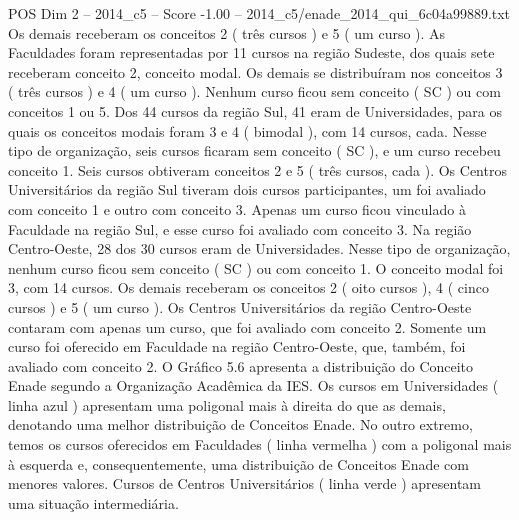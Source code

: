 \begin{textsample}{POS Dim 2 – 2014\_c5 – Score -1.00 – 2014\_c5/enade\_2014\_qui\_6c04a99889.txt}
Os demais receberam os conceitos 2 ( três cursos ) e 5 ( um curso ).
As Faculdades foram representadas por 11 cursos na região Sudeste, dos quais sete receberam conceito 2, conceito modal.
Os demais se distribuíram nos conceitos 3 ( três cursos ) e 4 ( um curso ).
Nenhum curso ficou sem conceito ( SC ) ou com conceitos 1 ou 5.
Dos 44 cursos da região Sul, 41 eram de Universidades, para os quais os conceitos modais foram 3 e 4 ( bimodal ), com 14 cursos, cada.
Nesse tipo de organização, seis cursos ficaram sem conceito ( SC ), e um curso recebeu conceito 1.
Seis cursos obtiveram conceitos 2 e 5 ( três cursos, cada ).
Os Centros Universitários da região Sul tiveram dois cursos participantes, um foi avaliado com conceito 1 e outro com conceito 3.
Apenas um curso ficou vinculado à Faculdade na região Sul, e esse curso foi avaliado com conceito 3.
Na região Centro-Oeste, 28 dos 30 cursos eram de Universidades.
Nesse tipo de organização, nenhum curso ficou sem conceito ( SC ) ou com conceito 1.
O conceito modal foi 3, com 14 cursos.
Os demais receberam os conceitos 2 ( oito cursos ), 4 ( cinco cursos ) e 5 ( um curso ).
Os Centros Universitários da região Centro-Oeste contaram com apenas um curso, que foi avaliado com conceito 2.
Somente um curso foi oferecido em Faculdade na região Centro-Oeste, que, também, foi avaliado com conceito 2.
O Gráfico 5.6 apresenta a distribuição do Conceito Enade segundo a Organização Acadêmica da IES.
Os cursos em Universidades ( linha azul ) apresentam uma poligonal mais à direita do que as demais, denotando uma melhor distribuição de Conceitos Enade.
No outro extremo, temos os cursos oferecidos em Faculdades ( linha vermelha ) com a poligonal mais à esquerda e, consequentemente, uma distribuição de Conceitos Enade com menores valores.
Cursos de Centros Universitários ( linha verde ) apresentam uma situação intermediária.

\end{textsample}
